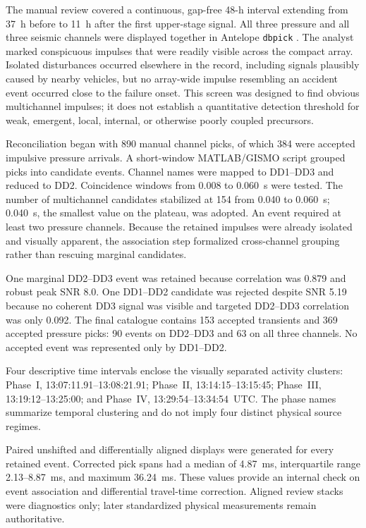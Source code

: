 \documentclass[]{seismica}
\begin{document}
The manual review covered a continuous, gap-free 48-h interval extending from
37~h before to 11~h after the first upper-stage signal. All three pressure and
all three seismic channels were displayed together in Antelope
\texttt{dbpick} \citep{brtt_antelope}. The analyst marked conspicuous impulses that were readily
visible across the compact array. Isolated disturbances occurred elsewhere in
the record, including signals plausibly caused by nearby vehicles, but no
array-wide impulse resembling an accident event occurred close to the failure
onset. This screen was designed to find obvious multichannel impulses; it does
not establish a quantitative detection threshold for weak, emergent, local,
internal, or otherwise poorly coupled precursors.

Reconciliation began with 890 manual channel picks, of which 384 were accepted
impulsive pressure arrivals. A short-window MATLAB/GISMO script
\citep{thompson_gismo_2017} grouped picks into candidate events. Channel names
were mapped to DD1--DD3 and reduced to
DD2. Coincidence windows from 0.008 to 0.060~s were tested. The number of
multichannel candidates stabilized at 154 from 0.040 to 0.060~s; 0.040~s, the
smallest value on the plateau, was adopted. An event required at least two
pressure channels. Because the retained impulses were already isolated and
visually apparent, the association step formalized cross-channel grouping
rather than rescuing marginal candidates.

One marginal DD2--DD3 event was retained because correlation was 0.879 and
robust peak SNR 8.0. One DD1--DD2 candidate was rejected despite SNR 5.19
because no coherent DD3 signal was visible and targeted DD2--DD3 correlation
was only 0.092. The final catalogue contains 153 accepted transients and 369
accepted pressure picks: 90 events on DD2--DD3 and 63 on all three channels.
No accepted event was represented only by DD1--DD2.

Four descriptive time intervals enclose the visually separated activity
clusters: Phase~I, 13:07:11.91--13:08:21.91; Phase~II,
13:14:15--13:15:45; Phase~III, 13:19:12--13:25:00; and Phase~IV,
13:29:54--13:34:54~UTC. The phase names summarize temporal clustering and do
not imply four distinct physical source regimes.

Paired unshifted and differentially aligned displays were generated for every
retained event. Corrected pick spans had a median of 4.87~ms, interquartile
range 2.13--8.87~ms, and maximum 36.24~ms. These values provide an internal
check on event association and differential travel-time correction. Aligned
review stacks were diagnostics only; later standardized physical measurements
remain authoritative.
\end{document}
